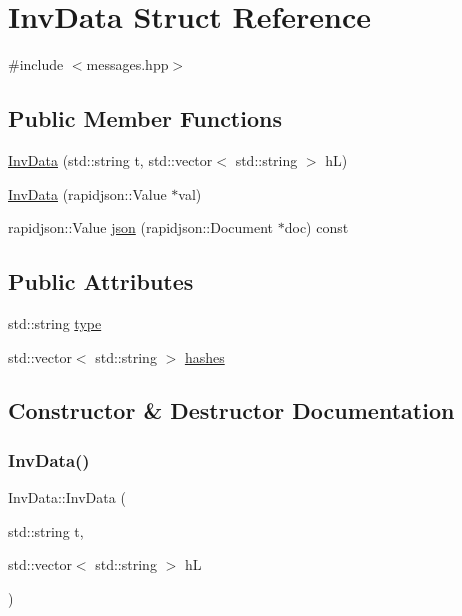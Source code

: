 \hypertarget{structInvData}{}\section{Inv\+Data Struct Reference}
\label{structInvData}


{\ttfamily \#include $<$messages.\+hpp$>$}

\subsection*{Public Member Functions}
\begin{DoxyCompactItemize}
\item 
\mbox{\hyperlink{structInvData_a04e2f1104af7ef52d684101c61a4873b}{Inv\+Data}} (std\+::string t, std\+::vector$<$ std\+::string $>$ hL)
\item 
\mbox{\hyperlink{structInvData_af6b3a71e6b4e0487f33ccf0b22a38813}{Inv\+Data}} (rapidjson\+::\+Value $\ast$val)
\item 
rapidjson\+::\+Value \mbox{\hyperlink{structInvData_a660c6492448faa3a19ac27c62047152d}{json}} (rapidjson\+::\+Document $\ast$doc) const
\end{DoxyCompactItemize}
\subsection*{Public Attributes}
\begin{DoxyCompactItemize}
\item 
std\+::string \mbox{\hyperlink{structInvData_a65d4044e395865238407578784cfccea}{type}}
\item 
std\+::vector$<$ std\+::string $>$ \mbox{\hyperlink{structInvData_ac7cd0400472c8a41a86960bc37ad7a3d}{hashes}}
\end{DoxyCompactItemize}


\subsection{Constructor \& Destructor Documentation}
\mbox{\label{structInvData_a04e2f1104af7ef52d684101c61a4873b}} 
\subsubsection{\texorpdfstring{Inv\+Data()}{InvData()}\hspace{0.1cm}{\footnotesize\ttfamily [1/2]}}
{\footnotesize\ttfamily Inv\+Data\+::\+Inv\+Data (\begin{DoxyParamCaption}\item[{std\+::string}]{t,  }\item[{std\+::vector$<$ std\+::string $>$}]{hL }\end{DoxyParamCaption})}


